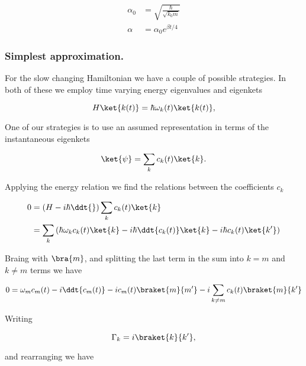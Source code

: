\begin{align}\label{eqn:qmTwoExamReflection:1030}
\alpha_0 &= \sqrt{\frac{\hbar}{\sqrt{k_0 m}}} \\
\alpha &= \alpha_0 e^{\beta t/4}
\end{align}

\subsubsection{Simplest approximation.}

For the slow changing Hamiltonian we have a couple of possible strategies.  In both of these we employ time varying energy eigenvalues and eigenkets

\begin{equation}\label{eqn:qmTwoExamReflection:390}
H \ket{k(t)} = \hbar \omega_k(t) \ket{k(t)},
\end{equation}

One of our strategies is to use an assumed representation in terms of the instantaneous eigenkets

\begin{equation}\label{eqn:qmTwoExamReflection:410}
\ket{\psi} = \sum_k c_k(t) \ket{k}.
\end{equation}

Applying the energy relation we find the relations between the coefficients $c_k$

\begin{align*}
0 
&= \left( 
H - i \hbar \ddt{}
\right)
\sum_k c_k(t) \ket{k} 
\\
&= 
\sum_k 
\left(
\hbar \omega_k 
c_k(t) \ket{k} 
-i \hbar
\ddt{c_k(t)} \ket{k} 
-i \hbar
c_k(t) \ket{k'} 
\right)
\end{align*}

Braing with $\bra{m}$, and splitting the last term in the sum into $k = m$ and $k \ne m$ terms we have

\begin{equation}\label{eqn:qmTwoExamReflection:430}
0 
=
\omega_m 
c_m(t) 
-i 
\ddt{c_m(t)} 
-i 
c_m(t) \braket{m}{m'} 
-i 
\sum_{k \ne m}
c_k(t) \braket{m}{k'} 
\end{equation}

Writing

\begin{equation}\label{eqn:qmTwoExamReflection:450}
\Gamma_k = i \braket{k}{k'},
\end{equation}

and rearranging we have

